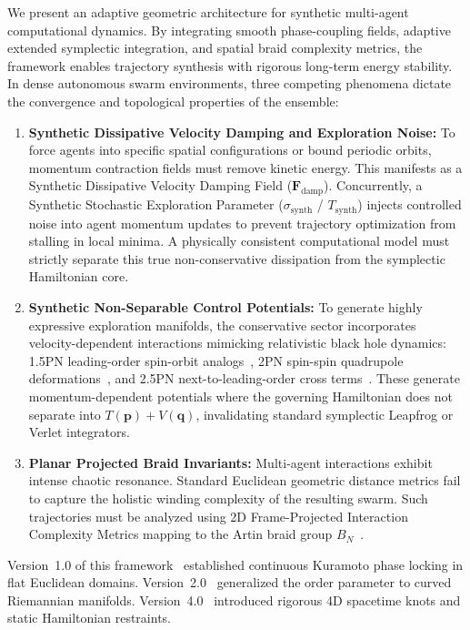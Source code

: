 \documentclass[11pt,a4paper,reqno]{article}
\theoremstyle{plain}
\theoremstyle{definition}
\theoremstyle{remark}
\numberwithin{equation}{section}
\begin{document}
We present an adaptive geometric architecture for synthetic multi-agent computational dynamics. By integrating smooth phase-coupling fields, adaptive extended symplectic integration, and spatial braid complexity metrics, the framework enables trajectory synthesis with rigorous long-term energy stability. In dense autonomous swarm environments, three competing phenomena dictate the convergence and topological properties of the ensemble:
\begin{enumerate}
    \item \textbf{Synthetic Dissipative Velocity Damping and Exploration Noise:} To force agents into specific spatial configurations or bound periodic orbits, momentum contraction fields must remove kinetic energy. This manifests as a Synthetic Dissipative Velocity Damping Field ($\mathbf{F}_{\mathrm{damp}}$). Concurrently, a Synthetic Stochastic Exploration Parameter ($\sigma_{\mathrm{synth}}$ / $T_{\mathrm{synth}}$) injects controlled noise into agent momentum updates to prevent trajectory optimization from stalling in local minima. A physically consistent computational model must strictly separate this true non-conservative dissipation from the symplectic Hamiltonian core.
    \item \textbf{Synthetic Non-Separable Control Potentials:} To generate highly expressive exploration manifolds, the conservative sector incorporates velocity-dependent interactions mimicking relativistic black hole dynamics: 1.5PN leading-order spin-orbit analogs~\cite{BarkerOConnell1979}, 2PN spin-spin quadrupole deformations~\cite{Kidder1995}, and 2.5PN next-to-leading-order cross terms~\cite{FayeBlanchetBuonanno2006,DamourJaranowskiSchafer2008}. These generate momentum-dependent potentials where the governing Hamiltonian does not separate into $T(\bm{p}) + V(\bm{q})$, invalidating standard symplectic Leapfrog or Verlet integrators.
    \item \textbf{Planar Projected Braid Invariants:} Multi-agent interactions exhibit intense chaotic resonance. Standard Euclidean geometric distance metrics fail to capture the holistic winding complexity of the resulting swarm. Such trajectories must be analyzed using 2D Frame-Projected Interaction Complexity Metrics mapping to the Artin braid group $B_N$~\cite{Artin1947,Birman1974}.
\end{enumerate}

Version~1.0 of this framework~\cite{Ananda2026V1} established continuous Kuramoto phase locking in flat Euclidean domains. Version~2.0~\cite{Ananda2026V2} generalized the order parameter to curved Riemannian manifolds. Version~4.0~\cite{Ananda2026V4} introduced rigorous 4D spacetime knots and static Hamiltonian restraints.
\end{document}
